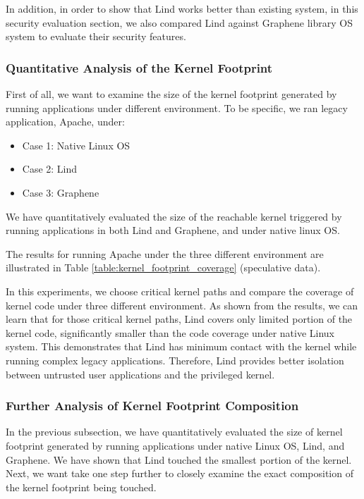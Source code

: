 In addition, in order to show that Lind works better than existing system, in this security evaluation section, we also compared 
Lind against Graphene library OS system \cite{Graphene:14} to evaluate their security features. 


\subsubsection{Quantitative Analysis of the Kernel Footprint}

First of all, we want to examine the size of the kernel footprint generated by running applications under different environment.
To be specific, we ran legacy application, Apache, under: 

\begin{itemize} 
  \item Case 1: Native Linux OS
  \item Case 2: Lind
  \item Case 3: Graphene
\end{itemize}

We have quantitatively evaluated the size of the reachable kernel triggered by running applications in both Lind and Graphene, 
and under native linux OS.

The results for running Apache under the three different environment are illustrated in Table \ref{table:kernel_footprint_coverage} 
(speculative data).
 
In this experiments, we choose critical kernel paths and compare the coverage of kernel code under three different 
environment.
As shown from the results, we can learn that for those critical kernel paths, Lind covers only limited portion of the kernel code, 
significantly smaller than the code coverage under native Linux system. This demonstrates that Lind has minimum contact 
with the kernel while running complex legacy applications. Therefore, Lind provides better isolation between untrusted user 
applications and the privileged kernel. 


\subsubsection{Further Analysis of Kernel Footprint Composition}

In the previous subsection, we have quantitatively evaluated the size of kernel footprint generated by running applications 
under native Linux OS, Lind, and Graphene. We have shown that Lind touched the smallest portion of the kernel. 
Next, we want take one step further to closely examine the exact composition of the kernel footprint being touched. 

